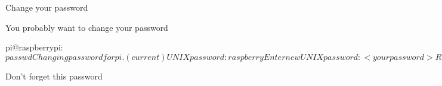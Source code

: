 \begin{frame}
   {Change your password}

   You probably want to change your password

   \begin{raw}
pi@raspberrypi:~$ passwd
Changing password for pi.
(current) UNIX password: raspberry
Enter new UNIX password: <your password>
Retype new UNIX password: <your password again>
passwd: password updated successfully
pi@raspberrypi:~$ 
   \end{raw}

   Don't forget this password
\end{frame}

\cprotect\note{


}

